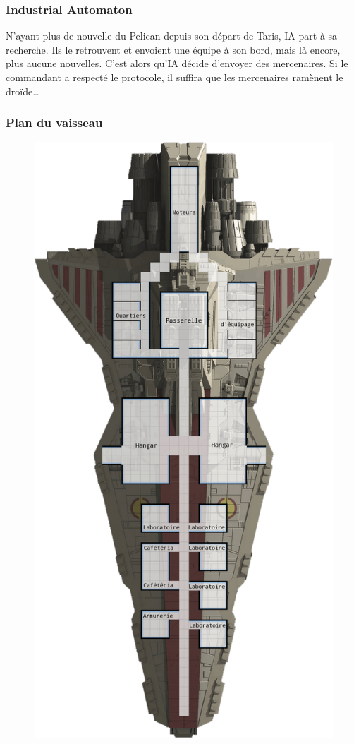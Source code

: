 \subsubsection{Industrial Automaton}
N’ayant plus de nouvelle du Pelican depuis son départ de Taris, IA part à sa recherche. Ils le retrouvent et envoient une équipe à son bord, mais là encore, plus aucune nouvelles. C’est alors qu’IA décide d’envoyer des mercenaires. Si le commandant a respecté le protocole, il suffira que les mercenaires ramènent le droïde\ldots

\onecolumn
\subsubsection{Plan du vaisseau}

\begin{figure}[!h]
	\centering
	\includegraphics[height=0.87\textheight]{_img/dos-au-muur/venator-plan.png}

\end{figure}

